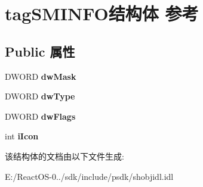 \hypertarget{structtag_s_m_i_n_f_o}{}\section{tag\+S\+M\+I\+N\+F\+O结构体 参考}
\label{structtag_s_m_i_n_f_o}
\subsection*{Public 属性}
\begin{DoxyCompactItemize}
\item 
\mbox{\label{structtag_s_m_i_n_f_o_a9f725161a5ffd1f1e96cb7984cad6344}} 
D\+W\+O\+RD {\bfseries dw\+Mask}
\item 
\mbox{\label{structtag_s_m_i_n_f_o_a81048fd54a30ff1a1781d538d5bfe333}} 
D\+W\+O\+RD {\bfseries dw\+Type}
\item 
\mbox{\label{structtag_s_m_i_n_f_o_af1ee11195ad5804b2e5ab4b0e6da9df5}} 
D\+W\+O\+RD {\bfseries dw\+Flags}
\item 
\mbox{\label{structtag_s_m_i_n_f_o_a212226f1df8e78d1a9e01142313de7f8}} 
int {\bfseries i\+Icon}
\end{DoxyCompactItemize}


该结构体的文档由以下文件生成\+:\begin{DoxyCompactItemize}
\item 
E\+:/\+React\+O\+S-\/0../sdk/include/psdk/shobjidl.\+idl\end{DoxyCompactItemize}
